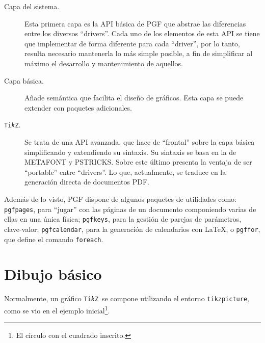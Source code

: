 \documentclass[a4paper,10pt]{article}
\newcommand{\ttikz}{{\tt Ti\emph{k}Z}}
\newcommand{\mi}[1]{\texttt{#1}} %
\begin{document}
\begin{description}
    \item[Capa del sistema.] Esta primera capa es la API básica de PGF que abstrae las diferencias entre los diversos “drivers”. Cada uno de los elementos de esta API se tiene que implementar de forma diferente para cada “driver”, por lo tanto, resulta necesario mantenerla lo más simple posible, a fin de simplificar al máximo el desarrollo y mantenimiento de aquellos.
    
    \item[Capa básica.] Añade semántica que facilita el diseño de gráficos. Esta capa se puede extender con paquetes adicionales.
    
   \item[\ttikz.] Se trata de una API avanzada, que hace de “frontal” sobre la capa básica simplificando y extendiendo su sintaxis. Su sintaxis se basa en la de METAFONT y PSTRICKS. Sobre este último presenta la ventaja de ser “portable” entre “drivers”. Lo que, actualmente, se traduce en la generación directa de documentos PDF.
 
\end{description}

Además de lo visto, PGF dispone de algunos paquetes de utilidades como: \mi{pgfpages}, para “jugar” con las páginas de un documento componiendo varias de ellas en una única física; \mi{pgfkeys}, para la gestión de parejas de parámetros, clave-valor; \mi{pgfcalendar}, para la generación de calendarios con \LaTeX, o \mi{pgffor}, que define el comando \mi{foreach}.

\section{Dibujo básico}

Normalmente, un gráfico \ttikz\ se compone utilizando el entorno \mi{tikzpicture}, como se vio en el ejemplo inicial\footnote{El círculo con el cuadrado inscrito.}.
\end{document}
